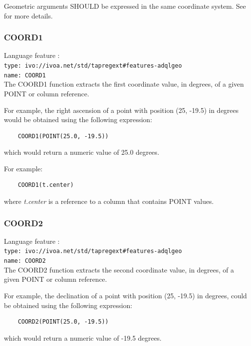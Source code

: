 \documentclass[11pt,a4paper]{ivoa}
\begin{document}
Geometric arguments SHOULD be expressed in the same coordinate system.
See  for more details.

\subsubsection{COORD1}
\label{sec:functions.geom.coord1}
{\footnotesize Language feature :}\\
{\footnotesize \verb|type: ivo://ivoa.net/std/tapregext#features-adqlgeo|}\\
{\footnotesize \verb|name: COORD1|}\\

The COORD1 function extracts the first coordinate value, in degrees, of a given
POINT  or column reference.

For example, the right ascension of a point with position (25, -19.5) in
degrees would be obtained using the following expression:
\begin{verbatim}
    COORD1(POINT(25.0, -19.5))
\end{verbatim}
\noindent
which would return a numeric value of 25.0 degrees.

For example:
\begin{verbatim}
    COORD1(t.center)
\end{verbatim}
\noindent
where \textit{t.center} is a reference to a column that contains POINT values.

\subsubsection{COORD2}
\label{sec:functions.geom.coord2}
{\footnotesize Language feature :}\\
{\footnotesize \verb|type: ivo://ivoa.net/std/tapregext#features-adqlgeo|}\\
{\footnotesize \verb|name: COORD2|}\\

The COORD2 function extracts the second coordinate value, in degrees, of a given
POINT  or column reference.

For example, the declination of a point with position (25, -19.5) in degrees,
could be obtained using the following expression:
\begin{verbatim}
    COORD2(POINT(25.0, -19.5))
\end{verbatim}
\noindent
which would return a numeric value of -19.5 degrees.
\end{document}
